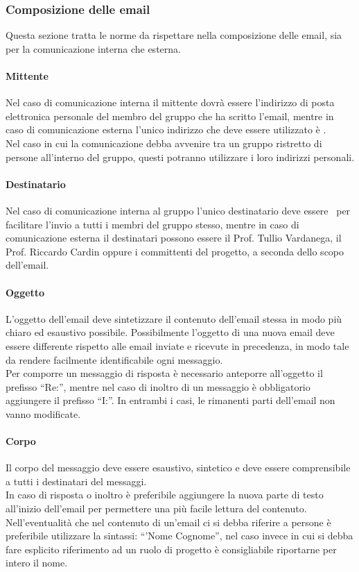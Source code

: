 \documentclass[../NormeProgetto.tex]{subfiles}
\begin{document}
		\subsubsection{Composizione delle email}
		Questa sezione tratta le norme da rispettare nella composizione delle email, sia per la comunicazione interna che esterna.
		\paragraph{Mittente}
		Nel caso di comunicazione interna il mittente dovrà essere l'indirizzo di posta elettronica personale del membro del gruppo che ha scritto l'email, mentre in caso di comunicazione esterna l'unico indirizzo che deve essere utilizzato è \mailleaf. \\ Nel caso in cui la comunicazione debba avvenire tra un gruppo ristretto di persone all'interno del gruppo, questi potranno utilizzare i loro indirizzi personali.
		\paragraph{Destinatario}
		Nel caso di comunicazione interna al gruppo l'unico destinatario deve essere \mailinglist\ per facilitare l'invio a tutti i membri del gruppo stesso, mentre in caso di comunicazione esterna il destinatari possono essere il Prof. Tullio Vardanega, il Prof. Riccardo Cardin oppure i committenti del progetto, a seconda dello scopo dell'email.
		\paragraph{Oggetto}
		L'oggetto dell'email deve sintetizzare il contenuto dell'email stessa in modo più chiaro ed esaustivo possibile. Possibilmente l'oggetto di una nuova email deve essere differente rispetto alle email inviate e ricevute in precedenza, in modo tale da rendere facilmente identificabile ogni messaggio. \\ Per comporre un messaggio di risposta è necessario anteporre all'oggetto il prefisso ``Re:'', mentre nel caso di inoltro di un messaggio è obbligatorio aggiungere il prefisso ``I:''. In entrambi i casi, le rimanenti parti dell'email non vanno modificate.
		\paragraph{Corpo}
		Il corpo del messaggio deve essere esaustivo, sintetico e deve essere comprensibile a tutti i destinatari del messaggi. \\ In caso di risposta o inoltro è preferibile aggiungere la nuova parte di testo all'inizio dell'email per permettere una più facile lettura del contenuto. \\ Nell'eventualità che nel contenuto di un'email ci si debba riferire a persone è preferibile utilizzare la sintassi: ``'Nome Cognome'', nel caso invece in cui si debba fare esplicito riferimento ad un ruolo di progetto è consigliabile riportarne per intero il nome.
\end{document}
